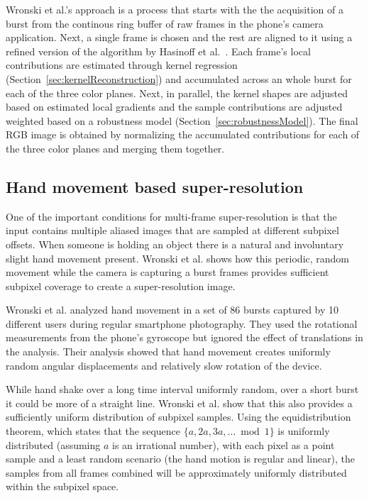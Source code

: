\documentclass{sig-alternate}
\begin{document}
Wronski et al.'s approach is a process that starts with the the acquisition of a burst from the continous ring buffer of raw frames in the phone's camera application. Next, a single frame is chosen and the rest are aligned to it using a refined version of the algorithm by Hasinoff et al.~\cite{Hasinoff2016}.
Each frame's local contributions are estimated through kernel regression (Section~\ref{sec:kernelReconstruction}) and accumulated across an whole burst for each of the three color planes.
Next, in parallel, the kernel shapes are adjusted based on estimated local gradients and the sample contributions are adjusted weighted based on a robustness model (Section~\ref{sec:robustnessModel}).
The final RGB image is obtained by normalizing the accumulated contributions for each of the three color planes and merging them together.

\subsection{Hand movement based super-resolution}

One of the important conditions for multi-frame super-resolution is that the input contains multiple aliased images that are sampled at different subpixel offsets. When someone is holding an object there is a natural and involuntary slight hand movement present. Wronski et al. shows how this periodic, random movement while the camera is capturing a burst frames provides sufficient subpixel coverage to create a super-resolution image.

Wronski et al. analyzed hand movement in a set of 86 bursts captured by 10 different users during regular smartphone photography. They used the rotational measurements from the phone's gyroscope but ignored the effect of translations in the analysis. Their analysis showed that hand movement creates uniformly random angular displacements and relatively slow rotation of the device.


While hand shake over a long time interval uniformly random, over a short burst it could be more of a straight line.
Wronski et al. show that this also provides a sufficiently uniform distribution of subpixel samples.
Using the equidistribution theorem, which states that the sequence $\{a,2a,3a,\dotsc \bmod 1\}$ is uniformly distributed (assuming $a$ is an irrational number), with each pixel as a point sample and a least random scenario (the hand motion is regular and linear), the samples from all frames combined will be approximately uniformly distributed within the subpixel space.
\end{document}
